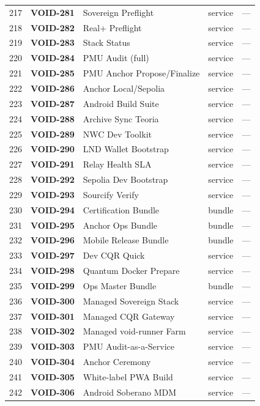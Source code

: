 \documentclass[10pt,a4paper,landscape]{article}
\begin{document}
\begin{longtable}{@{}rl p{4.2cm} p{1.4cm} p{3.8cm}@{}}
217 & \textbf{VOID-281} & Sovereign Preflight & service & — \\
218 & \textbf{VOID-282} & Real+ Preflight & service & — \\
219 & \textbf{VOID-283} & Stack Status & service & — \\
220 & \textbf{VOID-284} & PMU Audit (full) & service & — \\
221 & \textbf{VOID-285} & PMU Anchor Propose/Finalize & service & — \\
222 & \textbf{VOID-286} & Anchor Local/Sepolia & service & — \\
223 & \textbf{VOID-287} & Android Build Suite & service & — \\
224 & \textbf{VOID-288} & Archive Sync Teoria & service & — \\
225 & \textbf{VOID-289} & NWC Dev Toolkit & service & — \\
226 & \textbf{VOID-290} & LND Wallet Bootstrap & service & — \\
227 & \textbf{VOID-291} & Relay Health SLA & service & — \\
228 & \textbf{VOID-292} & Sepolia Dev Bootstrap & service & — \\
229 & \textbf{VOID-293} & Sourcify Verify & service & — \\
230 & \textbf{VOID-294} & Certification Bundle & bundle & — \\
231 & \textbf{VOID-295} & Anchor Ops Bundle & bundle & — \\
232 & \textbf{VOID-296} & Mobile Release Bundle & bundle & — \\
233 & \textbf{VOID-297} & Dev CQR Quick & service & — \\
234 & \textbf{VOID-298} & Quantum Docker Prepare & service & — \\
235 & \textbf{VOID-299} & Ops Master Bundle & bundle & — \\
236 & \textbf{VOID-300} & Managed Sovereign Stack & service & — \\
237 & \textbf{VOID-301} & Managed CQR Gateway & service & — \\
238 & \textbf{VOID-302} & Managed void-runner Farm & service & — \\
239 & \textbf{VOID-303} & PMU Audit-as-a-Service & service & — \\
240 & \textbf{VOID-304} & Anchor Ceremony & service & — \\
241 & \textbf{VOID-305} & White-label PWA Build & service & — \\
242 & \textbf{VOID-306} & Android Soberano MDM & service & — \\

\end{longtable}
\end{document}
